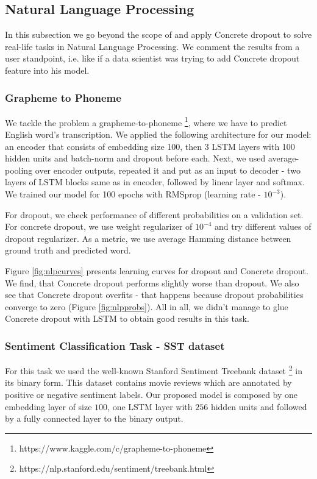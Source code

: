 \documentclass{article}
\begin{document}
\subsection{Natural Language Processing}

In this subsection we go beyond the scope of \cite{concrete} and apply Concrete dropout to solve real-life tasks in Natural Language Processing. We comment the results from a user standpoint, i.e. like if a data scientist was trying to add Concrete dropout feature into his model.

\subsubsection{Grapheme to Phoneme}

We tackle the problem a grapheme-to-phoneme \footnote{https://www.kaggle.com/c/grapheme-to-phoneme}, where we have to predict English word's transcription. We applied the following architecture for our model: an encoder that consists of embedding size 100, then 3 LSTM layers with 100 hidden units and batch-norm and dropout before each. Next, we used average-pooling over encoder outputs, repeated it and put as an input to decoder - two layers of LSTM blocks same as in encoder, followed by linear layer and softmax. We trained our model for 100 epochs with RMSprop (learning rate - $10^{-3}$).

For dropout, we check performance of different probabilities on a validation set. For concrete dropout, we use weight regularizer of $10^{-4}$ and try different values of dropout regularizer. As a metric, we use average Hamming distance between ground truth and predicted word.

Figure \ref{fig:nlpcurves} presents learning curves for dropout and Concrete dropout. We find, that Concrete dropout performs slightly worse than dropout. We also see that Concrete dropout overfits - that happens because dropout probabilities converge to zero (Figure \ref{fig:nlpprobs}). All in all, we didn't manage to glue Concrete dropout with LSTM to obtain good results in this task.

\subsubsection{Sentiment Classification Task - SST dataset }

For this task we used the well-known Stanford Sentiment Treebank dataset  \cite{socher2013}\footnote{https://nlp.stanford.edu/sentiment/treebank.html} in its binary form. This dataset contains movie reviews which are annotated by positive or negative sentiment labels. Our proposed model is composed by one embedding layer of size $100$, one  LSTM layer with $256$ hidden units and followed by a fully connected layer to the binary output. 
\end{document}
